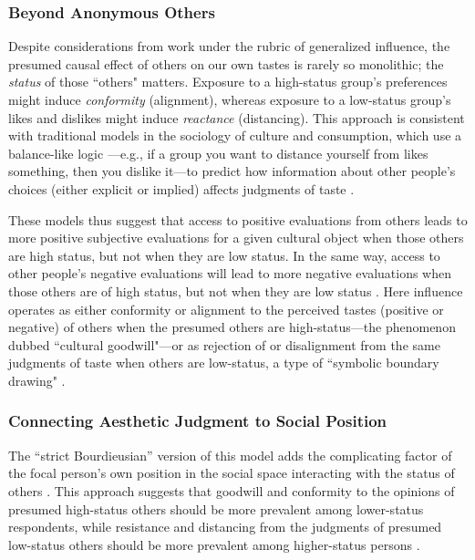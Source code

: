 \documentclass[12pt, letterpaper]{article}
\begin{document}
\subsubsection{Beyond Anonymous Others}

Despite considerations from work under the rubric of generalized influence, the presumed causal effect of others on our own tastes is rarely so monolithic; the \textit{status} of those ``others" matters. Exposure to a high-status group's preferences might induce \textit{conformity} (alignment), whereas exposure to a low-status group's likes and dislikes might induce \textit{reactance} (distancing). This approach is consistent with traditional models in the sociology of culture and consumption, which use a balance-like logic \citep{heider1946attitudes-ff3}---e.g., if a group you want to distance yourself from likes something, then you dislike it---to predict how information about other people's choices (either explicit or implied) affects judgments of taste \citep{okada2017structure}. 

These models thus suggest that access to positive evaluations from others leads to more positive subjective evaluations for a given cultural object when those others are high status, but not when they are low status. In the same way, access to other people’s negative evaluations will lead to more negative evaluations when those others are of high status, but not when they are low status \citep{lizardo2016cultural-aaa}. Here influence operates as either conformity or alignment to the perceived tastes (positive or negative) of others when the presumed others are high-status---the phenomenon \citep{bourdieu1984} dubbed ``cultural goodwill"---or as rejection of or disalignment from the same judgments of taste when others are low-status, a type of ``symbolic boundary drawing" \citep{bryson1996}.  

\subsubsection{Connecting Aesthetic Judgment to Social Position}

The ``strict Bourdieusian'' \citeyearpar {bourdieu1984} version of this model adds the complicating factor of the focal person's own position in the social space interacting with the status of others \citep{lizardo2016cultural-aaa}. This approach suggests that goodwill and conformity to the opinions of presumed high-status others should be more prevalent among lower-status respondents, while resistance and distancing from the judgments of presumed low-status others should be more prevalent among higher-status persons \citep{lizardo2016cultural-aaa}. 
\end{document}
